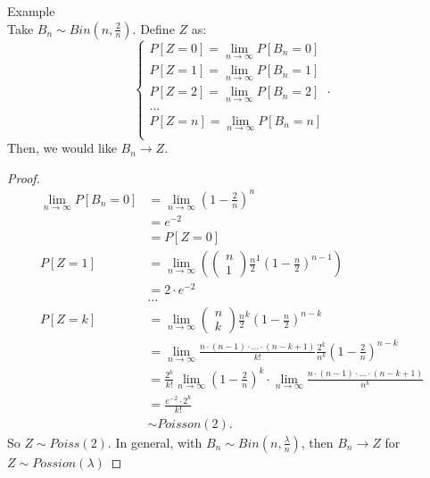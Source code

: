 \documentclass[a4paper]{article}
\begin{document}
\begin{note}{Example}\\
  Take $B_n \sim Bin(n, \frac{2}{n})$. Define $Z$ as:
   \[
  \begin{cases}
    P[Z=0] = \lim_{n \to \infty} P[B_n = 0] \\
    P[Z=1] = \lim_{n \to \infty} P[B_n = 1] \\
 P[Z=2] = \lim_{n \to \infty} P[B_n = 2] \\
 \ldots \\
 P[Z=n] = \lim_{n \to \infty} P[B_n = n] \\
  \end{cases}
  .\] 
  Then, we would like $B_n \to Z$. 

   \begin{proof}
     \begin{align*}
       \lim_{n \to \infty} P[B_n = 0] &= \lim_{n \to \infty} \left( 1 - \frac{2}{n} \right)^{n} \\
                                      &= e^{-2} \\
                                      &= P[Z=0] \\
        P[Z=1] &= \lim_{n \to \infty} \left( \begin{pmatrix} n\\ 1 \end{pmatrix} \frac{n}{2}^{1} \left( 1-\frac{n}{2} \right)^{n-1}  \right) \\
               &= 2 \cdot e^{-2} \\
               &\ldots\\
        P[Z =k] &= \lim_{n \to \infty} \begin{pmatrix} n\\ k \end{pmatrix} \frac{n}{2}^{k} \left( 1-\frac{n}{2} \right)^{n-k} \\
                &= \lim_{n \to \infty} \frac{n \cdot (n-1) \cdot \ldots \cdot (n-k+1)}{k!} \frac{2^{k}}{n^{k}} (1-\frac{2}{n})^{n-k} \\
                &= \frac{2^{k}}{k!} \lim_{n \to \infty} (1-\frac{2}{n})^{k} \cdot \lim_{n \to \infty} \frac{n \cdot (n-1) \cdot \ldots \cdot (n-k+1)}{n^{k}} \\
                &= \frac{e^{-2} \cdot 2^{k}}{k!} \\
                &\sim Poisson(2) 
     .\end{align*}
     So $Z \sim Poiss(2)$. In general, with $B_n \sim Bin(n, \frac{\lambda}{n})$, then $B_n \to Z$ for $Z \sim Possion(\lambda)$
  \end{proof}
\end{note}
\end{document}
